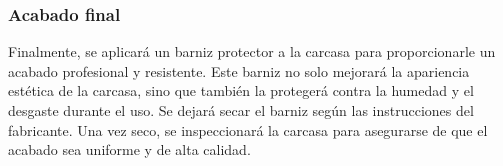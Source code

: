 \subsubsection{Acabado final}
Finalmente, se aplicará un barniz protector a la carcasa para proporcionarle un acabado profesional y resistente. Este barniz no solo mejorará la apariencia estética de la carcasa, sino que también la protegerá contra la humedad y el desgaste durante el uso. Se dejará secar el barniz según las instrucciones del fabricante. Una vez seco, se inspeccionará la carcasa para asegurarse de que el acabado sea uniforme y de alta calidad.